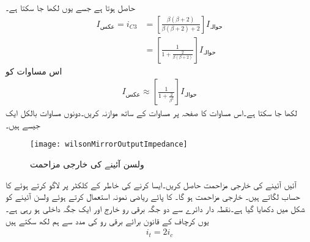 حاصل ہوتا ہے جسے یوں لکھا جا سکتا ہے۔
\begin{align*}
I_{\textrm{عکس}}=i_{C3}&=\left[\frac{\beta \left(\beta+2 \right)}{\beta \left(\beta+2 \right)+2}\right] I_{\textrm{حوالہ}}\\
&=\left[\frac{1}{1+\frac{2}{\beta \left(\beta+2 \right)}} \right] I_{\textrm{حوالہ}}
\end{align*}
اس مساوات کو 
\begin{align}
I_{\textrm{عکس}} \approx \left[\frac{1}{1+\frac{2}{\beta^2 }} \right] I_{\textrm{حوالہ}}
\end{align}
لکھا جا سکتا ہے۔اس مساوات کا صفحہ  پر مساوات  کے ساتھ موازنہ کریں۔دونوں مساوات بالکل ایک جیسے ہیں۔
\begin{figure}
\centering
\texttt{[image: wilsonMirrorOutputImpedance]}
\caption{ولسن آئینے کی خارجی مزاحمت}
\label{شکل_تفرقی_ولسن_آئینے_کی_خارجی_مزاحمت}
\end{figure}

آئیں آئینے کی خارجی مزاحمت حاصل کریں۔ایسا کرنے کی خاطر  کے کلکٹر پر  لاگو کرتے ہوئے  کا حساب لگاتے ہیں۔ خارجی مزاحمت  ہو گا۔ کا پائے ریاضی نمونہ استعمال کرتے ہوئے ولسن آئینے کو شکل  میں دکھایا گیا ہے۔نقطہ دار دائرے سے  دو جگہ  برقی رو خارج اور ایک جگہ  داخلی ہو رہی ہے۔یوں کرچاف کے قانون برائے برقی رو کی مدد سے ہم لکھ سکتے ہیں
\begin{align}\label{مساوات_تفرقی_ولسن_ٹیست_برقی_رو}
i_t=2 i_c
\end{align}

